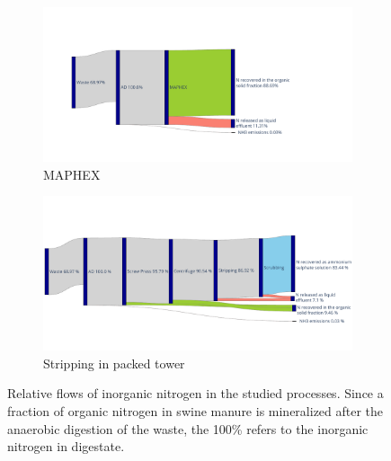 \begin{refsection}[referencesCh6]
\begin{figure}[h!]
	\begin{subfigure}[t]{0.93\textwidth}
		\centering
		\includegraphics[angle=0,width=0.7\linewidth, trim={1.9cm 2cm 4.5cm 3cm}, clip]{gfx/Chapter6/NitrogenFlow_MAPHEX_sankey.pdf} 
		\caption{MAPHEX}
		\label{fig:NitrogenFlow_MAPHEX_sankey}
	\end{subfigure}
	
	\bigskip
	
	\begin{subfigure}[t]{0.97\textwidth}
		\centering
		\includegraphics[angle=0,width=\linewidth, trim={0cm 2cm 0cm 3cm}, clip]{gfx/Chapter6/NitrogenFlow_AirStrippingPacked_sankey.pdf} 
		\caption{Stripping in packed tower}
		\label{fig:NitrogenFlow_StrippingPacked_sankey}
	\end{subfigure}


	\caption{Relative flows of inorganic nitrogen in the studied processes. Since a fraction of organic nitrogen in swine manure is mineralized after the anaerobic digestion of the waste, the 100\% refers to the inorganic nitrogen in digestate.}

\end{figure}
\begin{figure}[h!]	\ContinuedFloat 
\centering
	

\end{figure}
\end{refsection}
